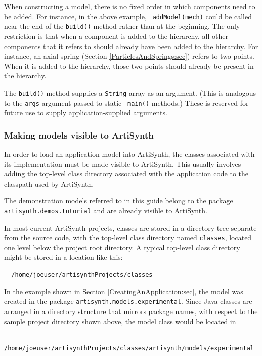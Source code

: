 When constructing a model, there is no fixed order in which components
need to be added. For instance, in the above example, {\tt
addModel(mech)} could be called near the end of the {\tt build()}
method rather than at the beginning. The only restriction is that when
a component is added to the hierarchy, all other components that it
refers to should already have been added to the hierarchy. For
instance, an axial spring (Section \ref{ParticlesAndSprings:sec})
refers to two points. When it is added to the hierarchy, those two
points should already be present in the hierarchy.

The {\tt build()} method supplies a {\tt String} array as an argument.
(This is analogous to the {\tt args} argument passed to static {\tt
main()} methods.) These is reserved for future use to supply
application-supplied arguments.

\subsubsection{Making models visible to ArtiSynth}

In order to load an application model into ArtiSynth, the classes
associated with its implementation must be made visible to ArtiSynth.
This usually involves adding the top-level class directory associated
with the application code to the classpath used by ArtiSynth.

\begin{sideblock}
The demonstration models referred to in this guide belong to the
package {\tt artisynth.demos.tutorial} and are already visible to
ArtiSynth.
\end{sideblock}

In most current ArtiSynth projects, classes are stored in
a directory tree separate from the source code, with the top-level
class directory named {\tt classes}, located one level below
the project root directory. A typical top-level class directory
might be stored in a location like this:
\begin{verbatim}
  /home/joeuser/artisynthProjects/classes
\end{verbatim}
In the example shown in Section \ref{CreatingAnApplication:sec}, the
model was created in the package {\tt artisynth.models.experimental}.
Since Java classes are arranged in a directory structure that mirrors
package names, with respect to the sample project directory shown
above, the model class would be located in
\begin{verbatim}
  /home/joeuser/artisynthProjects/classes/artisynth/models/experimental
\end{verbatim}

